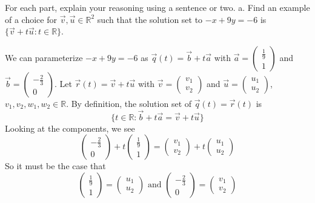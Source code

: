 \documentclass[12pt]{article}
\newenvironment{problem}[2][Problem]
{
	\begin{trivlist} 
		\item[\hskip \labelsep {\bfseries #1 #2:}]
	}
{
	\end{trivlist}
	}
\newenvironment{solution}[1][Solution]
{
	\begin{trivlist} 
		\item[\hskip \labelsep {\itshape #1:}]
	}
	{
	\end{trivlist}
}
\begin{document}
\newpage
\begin{problem}{3}
For each part, explain your reasoning using a sentence or two.
\newline
\newline
\noindent
a. Find an example of a choice for $\vec{v}, \vec{u} \in \mathbb{R}^2$ such that the solution set to $-x +9y=-6$ is $\{\vec{v} +t \vec{u} : t \in \mathbb{R} \}$.
\begin{solution}
We can parameterize $-x +9y=-6$ as $\vec{q}(t)=\vec{b} +t\vec{a}$ with $\vec{a} = \begin{pmatrix} \frac{1}{9} \\ 1 \end{pmatrix}$ and $\vec{b} = \begin{pmatrix}- \frac{2}{3}\\0\end{pmatrix}$. 
\noindent
Let $\vec{r}(t)=\vec{v} + t\vec{u}$ with $\vec{v} =  \begin{pmatrix} v_1 \\ v_2 \end{pmatrix}$ and $\vec{u} =  \begin{pmatrix} u_1 \\ u_2 \end{pmatrix}$, $v_1,v_2,w_1,w_2 \in \mathbb{R}$. By definition, the solution set of $\vec{q}(t)=\vec{r}(t)$ is
\[
\{t \in \mathbb{R} : \vec{b} +t\vec{a} = \vec{v} +t \vec{u}\}
\]
Looking at the components, we see
\[
\begin{pmatrix}- \frac{2}{3}\\0\end{pmatrix} + t\begin{pmatrix} \frac{1}{9} \\ 1 \end{pmatrix} = \begin{pmatrix} v_1 \\ v_2 \end{pmatrix} + t\begin{pmatrix} u_1 \\ u_2 \end{pmatrix}
\]
So it must be the case that
\[
\begin{pmatrix} \frac{1}{9} \\ 1 \end{pmatrix} = \begin{pmatrix} u_1 \\ u_2 \end{pmatrix} \text{ and } \begin{pmatrix}- \frac{2}{3}\\0\end{pmatrix} = \begin{pmatrix} v_1 \\ v_2 \end{pmatrix}
\]
\end{solution}
\end{problem}
\end{document}
